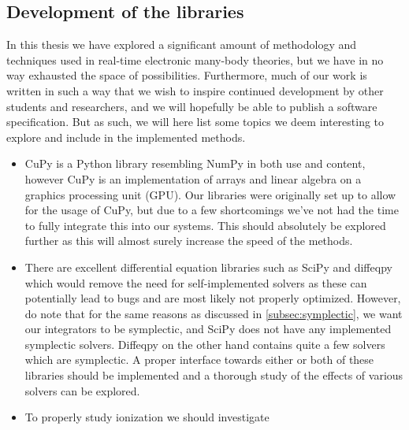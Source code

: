         \subsection{Development of the libraries}
            In this thesis we have explored a significant amount of methodology
            and techniques used in real-time electronic many-body theories, but
            we have in no way exhausted the space of possibilities.
            Furthermore, much of our work is written in such a way that we wish
            to inspire continued development by other students and researchers,
            and we will hopefully be able to publish a software specification.
            But as such, we will here list some topics we deem interesting to
            explore and include in the implemented methods.
            \begin{itemize}
                \item CuPy \cite{cupy} is a Python library resembling NumPy
                    \cite{numpy} in both use and content, however CuPy is an
                    implementation of arrays and linear algebra on a graphics
                    processing unit (GPU).
                    Our libraries were originally set up to allow for the usage
                    of CuPy, but due to a few shortcomings we've not had the
                    time to fully integrate this into our systems.
                    This should absolutely be explored
                    further as this will almost surely increase the speed of the
                    methods.
                \item There are excellent differential equation libraries
                    such as SciPy \cite{scipy} and diffeqpy \cite{julia-diff}
                    which would remove the need for self-implemented solvers as
                    these can potentially lead to bugs and are most likely not
                    properly optimized.
                    However, do note that for the same reasons as discussed in
                    \autoref{subsec:symplectic}, we want our integrators to be
                    symplectic, and SciPy does not have any implemented
                    symplectic solvers.
                    Diffeqpy on the other hand contains quite a few solvers
                    which are symplectic.
                    A proper interface towards either or both of these libraries
                    should be implemented and a thorough study of the effects of
                    various solvers can be explored.
                \item To properly study ionization we should investigate

\end{itemize}
